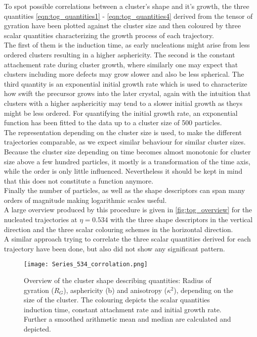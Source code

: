 To spot possible correlations between a cluster's shape and it's growth, the three quantities \autoref{eqn:tog_quantities1} - \ref{eqn:tog_quantities4} derived from the tensor of gyration have been plotted against the cluster size and then coloured by three scalar quantities characterizing the growth process of each trajectory.\\ 
The first of them is the induction time, as early nucleations might arise from less ordered clusters resulting in a higher asphericity. The second is the constant attachement rate during cluster growth, where similarly one may expect that clusters including more defects may grow slower and also be less spherical. The third quantity is an exponential initial growth rate which is used to characterize how swift the precursor grows into the later crystal, again with the intuition that clusters with a higher asphericitiy may tend to a slower initial growth as theys might be less ordered. For quantifying the initial growth rate, an exponential function has been fitted to the data up to a cluster size of 500 particles.\\
The representation depending on the cluster size is used, to make the different trajectories comparable, as we expect similar behaviour for similar cluster sizes. Because the cluster size depending on time becomes almost monotonic for cluster size above a few hundred particles, it mostly is a transformation of the time axis, while the order is only little influenced. Nevertheless it should be kept in mind that this does not constitute a function anymore.\\
Finally the number of particles, as well as the shape descriptors can span many orders of magnitude making logarithmic scales useful.\\

A large overview produced by this procedure is given in \autoref{fig:tog_overview} for the nucleated trajectories at $\eta=0.534$ with the three shape descriptors in the vertical direction and the three scalar colouring schemes in the horizontal direction.\\

A similar approach trying to correlate the three scalar quantities derived for each trajectory have been done, but also did not show any significant pattern.  

\begin{figure}[!h]
\centering
\texttt{[image: Series\_534\_corrolation.png]}
\caption[Results of Tensor of Gyration quantities from production data]{Overview of the cluster shape describing quantities: Radius of gyration ($R_G$), asphericity (b) and anisotropy ($\kappa^2$), depending on the size of the cluster. The colouring depicts the scalar quantities induction time, constant attachment rate and initial growth rate. Further a smoothed arithmetic mean and median are calculated and depicted.}
\label{fig:tog_overview}
\end{figure}

